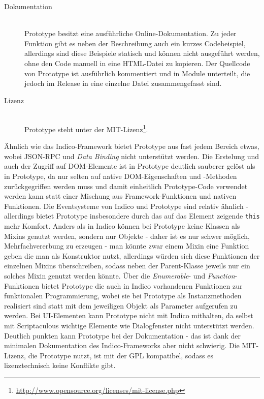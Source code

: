 \begin{description}
\item[Dokumentation] \hfill \\
Prototype besitzt eine ausführliche Online-Dokumentation. Zu jeder Funktion gibt es neben der
Beschreibung auch ein kurzes Codebeispiel, allerdings sind diese Beispiele statisch und können nicht
ausgeführt werden, ohne den Code manuell in eine HTML-Datei zu kopieren. Der Quellcode von Prototype
ist ausführlich kommentiert und in Module unterteilt, die jedoch im Release in eine einzelne Datei
zusammengefasst sind.

\item[Lizenz] \hfill \\
Prototype steht unter der
MIT-Lizenz\footnote{\href{http://www.opensource.org/licenses/mit-license.php}{http://www.opensource.org/licenses/mit-license.php}}.
\end{description}

Ähnlich wie das Indico-Framework bietet Prototype aus fast jedem Bereich etwas, wobei JSON-RPC und
\emph{Data Binding} nicht unterstützt werden.
Die Erstelung und auch der Zugriff auf DOM-Elemente ist in Prototype deutlich sauberer gelöst als in
Prototype, da nur selten auf native DOM-Eigenschaften und -Methoden zurückgegriffen werden muss und
damit einheitlich Prototype-Code verwendet werden kann statt einer Mischung aus Framework-Funktionen
und nativen Funktionen. Die Eventsysteme von Indico und Prototype sind relativ ähnlich - allerdings
bietet Prototype insbesondere durch das auf das Element zeigende \lstinline{this} mehr Komfort.
Anders als in Indico können bei Prototype keine Klassen als Mixins genutzt werden, sondern nur
Objekte - daher ist es nur schwer möglich, Mehrfachvererbung zu erzeugen - man könnte zwar einem
Mixin eine Funktion geben die man als Konstruktor nutzt, allerdings würden sich diese Funktionen der
einzelnen Mixins überschreiben, sodass neben der Parent-Klasse jeweils nur ein solches Mixin genutzt
werden könnte. Über die \emph{Enumerable}- und \emph{Function}-Funktionen bietet Prototype die auch
in Indico vorhandenen Funktionen zur funktionalen Programmierung, wobei sie bei Prototype als
Instanzmethoden realisiert sind statt mit dem jeweiligen Objekt als Parameter aufgerufen zu werden.
Bei UI-Elementen kann Prototype nicht mit Indico mithalten, da selbst mit Scriptaculous wichtige
Elemente wie Dialogfenster nicht unterstützt werden. Deutlich punkten kann Prototype bei der
Dokumentation - das ist dank der minimalen Dokumentation des Indico-Frameworks aber nicht schwierig.
Die MIT-Lizenz, die Prototype nutzt, ist mit der GPL kompatibel, sodass es lizenztechnisch keine
Konflikte gibt.




